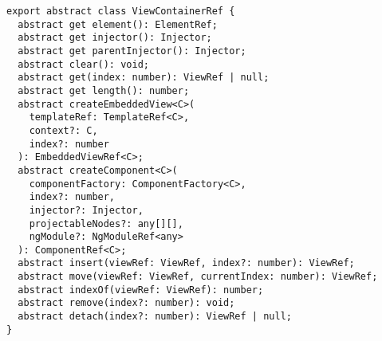 \begin{verbatim}
export abstract class ViewContainerRef {
  abstract get element(): ElementRef;
  abstract get injector(): Injector;
  abstract get parentInjector(): Injector;
  abstract clear(): void;
  abstract get(index: number): ViewRef | null;
  abstract get length(): number;
  abstract createEmbeddedView<C>(
    templateRef: TemplateRef<C>,
    context?: C,
    index?: number
  ): EmbeddedViewRef<C>;
  abstract createComponent<C>(
    componentFactory: ComponentFactory<C>,
    index?: number,
    injector?: Injector,
    projectableNodes?: any[][],
    ngModule?: NgModuleRef<any>
  ): ComponentRef<C>;
  abstract insert(viewRef: ViewRef, index?: number): ViewRef;
  abstract move(viewRef: ViewRef, currentIndex: number): ViewRef;
  abstract indexOf(viewRef: ViewRef): number;
  abstract remove(index?: number): void;
  abstract detach(index?: number): ViewRef | null;
}
\end{verbatim}
